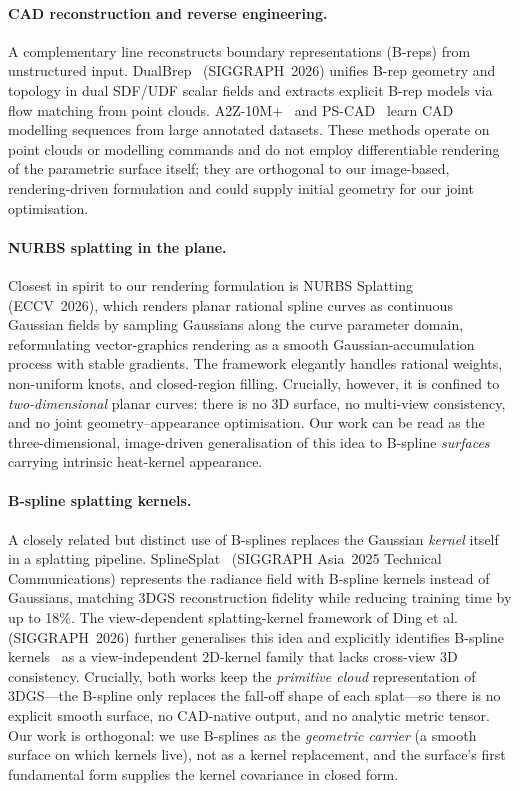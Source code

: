 \paragraph{CAD reconstruction and reverse engineering.}
A complementary line reconstructs boundary representations (B-reps) from
unstructured input. DualBrep~\cite{dualbrep} (SIGGRAPH~2026) unifies B-rep
geometry and topology in dual SDF/UDF scalar fields and extracts explicit
B-rep models via flow matching from point clouds. A2Z-10M+~\cite{a2z} and
PS-CAD~\cite{pscad} learn CAD modelling sequences from large annotated
datasets. These methods operate on point clouds or modelling commands and do
not employ differentiable rendering of the parametric surface itself; they
are orthogonal to our image-based, rendering-driven formulation and could
supply initial geometry for our joint optimisation.

\paragraph{NURBS splatting in the plane.}
Closest in spirit to our rendering formulation is NURBS
Splatting~\cite{nurbssplatting} (ECCV~2026), which renders planar rational
spline curves as continuous Gaussian fields by sampling Gaussians along the
curve parameter domain, reformulating vector-graphics rendering as a smooth
Gaussian-accumulation process with stable gradients. The framework elegantly
handles rational weights, non-uniform knots, and closed-region filling.
Crucially, however, it is confined to \emph{two-dimensional} planar curves:
there is no 3D surface, no multi-view consistency, and no joint
geometry--appearance optimisation. Our work can be read as the
three-dimensional, image-driven generalisation of this idea to B-spline
\emph{surfaces} carrying intrinsic heat-kernel appearance.

\paragraph{B-spline splatting kernels.}
A closely related but distinct use of B-splines replaces the Gaussian
\emph{kernel} itself in a splatting pipeline. SplineSplat~\cite{splinesplat}
(SIGGRAPH Asia~2025 Technical Communications) represents the radiance field
with B-spline kernels instead of Gaussians, matching 3DGS reconstruction
fidelity while reducing training time by up to 18\%. The view-dependent
splatting-kernel framework of Ding et al.~\cite{viewdepkernels}
(SIGGRAPH~2026) further generalises this idea and explicitly identifies
B-spline kernels~\cite{splinesplat} as a view-independent 2D-kernel family
that lacks cross-view 3D consistency. Crucially, both works keep the
\emph{primitive cloud} representation of 3DGS---the B-spline only replaces the
fall-off shape of each splat---so there is no explicit smooth surface, no
CAD-native output, and no analytic metric tensor. Our work is orthogonal:
we use B-splines as the \emph{geometric carrier} (a smooth surface on which
kernels live), not as a kernel replacement, and the surface's first
fundamental form supplies the kernel covariance in closed form.


